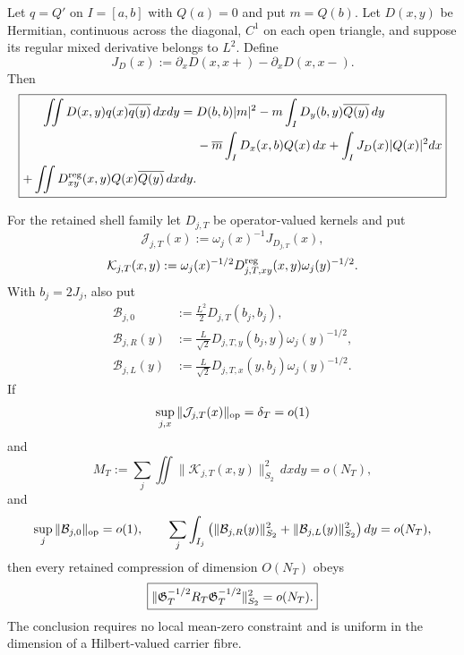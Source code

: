 \begin{lemma}
\label{lem:logonly-two-variable-primitive}
Let $q=Q'$ on $I=[a,b]$ with $Q(a)=0$ and put $m=Q(b)$.  Let $D(x,y)$ be Hermitian,
continuous across the diagonal, $C^1$ on each open triangle, and suppose its
regular mixed derivative belongs to $L^2$.  Define
\[
J_D(x):=\partial_xD(x,x+)-\partial_xD(x,x-).
\]
Then
\begin{equation}
\boxed{
\begin{aligned}
\iint D(x,y)q(x)\overline{q(y)}\,dxdy
={}&D(b,b)|m|^2
-m\int_I D_y(b,y)\overline{Q(y)}\,dy\\
&-\overline m\int_I D_x(x,b)Q(x)\,dx
+\int_I J_D(x)|Q(x)|^2dx\\
+\iint D_{xy}^{\rm reg}(x,y)Q(x)\overline{Q(y)}\,dxdy.
\end{aligned}
}
\label{eq:logonly-two-variable-primitive}
\end{equation}

For the retained shell family let $D_{j,T}$ be operator-valued kernels and put
\[
\mathcal J_{j,T}(x):=\omega_j(x)^{-1}J_{D_{j,T}}(x),
\]
\[
\mathcal K_{j,T}(x,y)
:=\omega_j(x)^{-1/2}D_{j,T,xy}^{\rm reg}(x,y)
\omega_j(y)^{-1/2}.
\]
With $b_j=2J_j$, also put
\begin{equation}
\begin{aligned}
\mathcal B_{j,0}&:=\frac{L^2}{2}D_{j,T}(b_j,b_j),\\
\mathcal B_{j,R}(y)&:=\frac L{\sqrt2}D_{j,T,y}(b_j,y)
 \omega_j(y)^{-1/2},\\
\mathcal B_{j,L}(y)&:=\frac L{\sqrt2}D_{j,T,x}(y,b_j)
 \omega_j(y)^{-1/2}.
\end{aligned}
\label{eq:primitive-boundary-coefficients}
\end{equation}
If
\begin{equation}
\sup_{j,x}\|\mathcal J_{j,T}(x)\|_{\operatorname{op}}=\delta_T=o(1)
\label{eq:logonly-jump-criterion}
\end{equation}
and
\begin{equation}
M_T:=\sum_j\iint
\|\mathcal K_{j,T}(x,y)\|_{S_2}^2\,dxdy=o(N_T),
\label{eq:logonly-mixed-criterion}
\end{equation}
and
\begin{equation}
\sup_j\|\mathcal B_{j,0}\|_{\operatorname{op}}=o(1),\qquad
\sum_j\int_{I_j}
\left(\|\mathcal B_{j,R}(y)\|_{S_2}^2
+\|\mathcal B_{j,L}(y)\|_{S_2}^2\right)dy=o(N_T),
\label{eq:logonly-boundary-criterion}
\end{equation}
then every retained compression of dimension $O(N_T)$ obeys
\begin{equation}
\boxed{
\|\mathfrak G_T^{-1/2}R_T\mathfrak G_T^{-1/2}\|_{S_2}^2
=o(N_T).
}
\label{eq:logonly-primitive-HS-criterion}
\end{equation}
The conclusion requires no local mean-zero constraint and is uniform in the
dimension of a Hilbert-valued carrier fibre.
\end{lemma}

